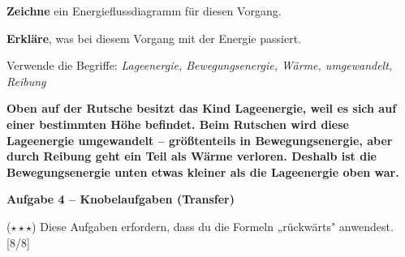 \documentclass[11pt, a4paper]{article}
\newcommand{\lsg}[1]{\textcolor{loesung}{\textbf{#1}}}
\newcommand{\punktebox}[1]{\hfill\small\textcolor{mittelgrau}{[#1/#1]}}
\newcommand{\aufgabe}[1]{%
    \needspace{4\baselineskip}%
    \vspace{10pt}%
    \noindent\textbf{\textcolor{fachfarbe}{Aufgabe #1}}%
    \vspace{4pt}%
    \nopagebreak[4]%
}
\newcommand{\operator}[1]{\textbf{\textcolor{fachfarbe}{#1}}}
\begin{document}
\begin{teil}
\item \operator{Zeichne} ein Energieflussdiagramm für diesen Vorgang.

\begin{center}
\end{center}

\vspace{0.5em}

\item \operator{Erkläre}, was bei diesem Vorgang mit der Energie passiert.

Verwende die Begriffe: \textit{Lageenergie, Bewegungsenergie, Wärme, umgewandelt, Reibung}

\lsg{Oben auf der Rutsche besitzt das Kind Lageenergie, weil es sich auf einer bestimmten Höhe befindet. Beim Rutschen wird diese Lageenergie umgewandelt – größtenteils in Bewegungsenergie, aber durch Reibung geht ein Teil als Wärme verloren. Deshalb ist die Bewegungsenergie unten etwas kleiner als die Lageenergie oben war.}
\end{teil}

\vspace{0.8em}

\aufgabe{4 – Knobelaufgaben (Transfer)}

($\star\star\star$) Diese Aufgaben erfordern, dass du die Formeln „rückwärts" anwendest. \punktebox{8}
\end{document}
